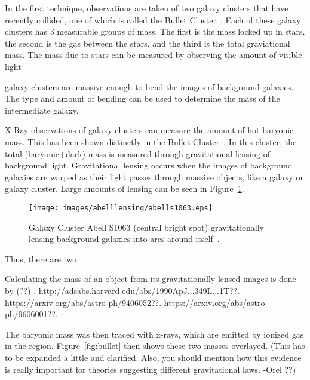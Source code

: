     In the first technique, observations are taken of two galaxy clusters that have recently collided, one of which is called the Bullet Cluster~\cite{bullet_cluster}.
    Each of these galaxy clusters has 3 measurable groups of mass.
    The first is the mass locked up in stars, the second is the gas between the stars, and the third is the total graviational mass.
    The mass due to stars can be measured by observing the amount of visible light



galaxy clusters are massive enough to bend the images of background galaxies.
    The type and amount of bending can be used to determine the mass of the intermediate galaxy.

    X-Ray observations of galaxy clusters can measure the amount of hot baryonic mass.
    This has been shown distinctly in the Bullet Cluster~\cite{bullet_cluster}.
    In this cluster, the total (baryonic+dark) mass is measured through gravitational lensing of background light.
    Gravitational lensing occurs when the images of background galaxies are warped as their light passes through massive objects, like a galaxy or galaxy cluster.
    Large amounts of lensing can be seen in Figure~\ref{fig:abelllensing}.
    
    \begin{figure}[ht]
      \centering
      \texttt{[image: images/abelllensing/abells1063.eps]}
      \caption[Abell S1063 Lensing]{
        Galaxy Cluster Abell S1063 (central bright spot) gravitationally lensing background galaxies into arcs around itself~\cite{abelllensing,clusterimages}.
      }
      \label{fig:abelllensing}
    \end{figure}
    

    Thus, there are two 
    
    Calculating the mass of an object from its gravitationally lensed images is done by {\color{red}(??)} \cite{}.
    {\color{red}\url{http://adsabs.harvard.edu/abs/1990ApJ...349L...1T}??}.
    {\color{red}\url{https://arxiv.org/abs/astro-ph/9406052}??}.
    {\color{red}\url{https://arxiv.org/abs/astro-ph/9606001}??}.
    
    The baryonic mass was then traced with x-rays, which are emitted by ionized gas in the region.
    Figure~\ref{fig:bullet} then shows these two masses overlayed.
    {\color{red}(This has to be expanded a little and clarified. Also, you should mention how this evidence is really important for theories suggesting different gravitational laws. -Orel ??)}

